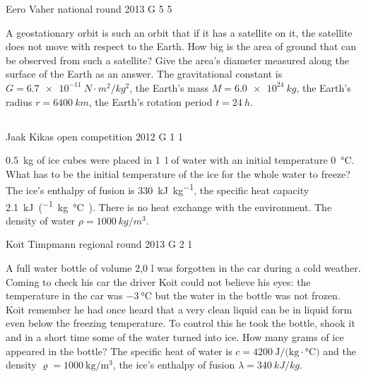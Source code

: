 \documentclass[11pt]{article}
\begin{document}
{Eero Vaher} %
{national round} %
{2013} %
{G 5} %
{5} %
{

\ifEngStatement
A geostationary orbit is such an orbit that if it has a satellite on it, the satellite does not move with respect to the Earth. How big is the area of ground that can be observed from such a satellite? Give the area’s diameter measured along the surface of the Earth as an answer. The gravitational constant is $G=\SI{6.7e-11}{N \cdot m^2/kg^2}$, the Earth’s mass $M=\SI{6,0e24}{kg}$, the Earth’s radius $r=\SI{6400}{km}$, the Earth’s rotation period $t=\SI{24}{h}$.
\fi
}
\newpage\subsection{\protect{}}

{Jaak Kikas} %
{open competition} %
{2012} %
{G 1} %
{1} %
{

\ifEngStatement
\SI{0,5}{kg} of ice cubes were placed in \SI{1}{l} of water with an initial temperature \SI{0}{\celsius}. What has to be the initial temperature of the ice for the whole water to freeze? The ice’s enthalpy of fusion is \SI{330}{\kilo\joule\per\kilo\gram}, the specific heat capacity \SI{2,1}{\kilo\joule\per(\kilogram.\celsius)}. There is no heat exchange with the environment. The density of water $\rho = \SI{1000}{kg/m^3}$.
\fi
}

{Koit Timpmann} %
{regional round} %
{2013} %
{G 2} %
{1} %
{

\ifEngStatement
A full water bottle of volume 2,0 l was forgotten in the car during a cold weather. Coming to check his car the driver Koit could not believe his eyes: the temperature in the car was $-\SI{3}{\celsius}$ but the water in the bottle was not frozen. Koit remember he had once heard that a very clean liquid can be in liquid form even below the freezing temperature. To control this he took the bottle, shook it and in a short time some of the water turned into ice. How many grams of ice appeared in the bottle? The specific heat of water is $c = \SI{4200}{\joule\per(\kilogram \cdot \celsius)}$ and the density $\varrho = \SI{1000}{\kilogram\per\meter\cubed}$, the ice’s enthalpy of fusion $\lambda = \SI{340}{ kJ/kg}$.
\fi
}
\end{document}
